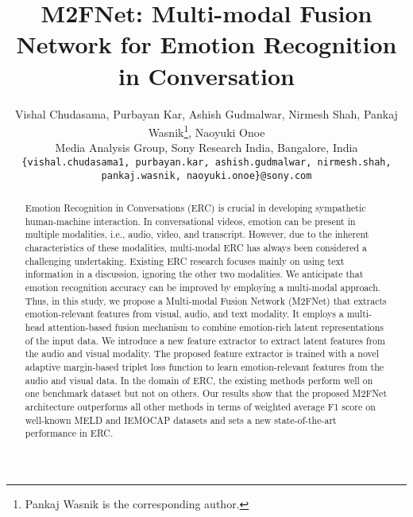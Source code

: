 \documentclass[10pt,twocolumn,letterpaper]{article}
\begin{document}
\title{M2FNet: Multi-modal Fusion Network for Emotion Recognition in Conversation}

\author{Vishal Chudasama, Purbayan Kar, Ashish Gudmalwar, Nirmesh Shah, Pankaj Wasnik\thanks{Pankaj Wasnik is the corresponding author.}, Naoyuki Onoe \\ Media Analysis Group, Sony Research India, Bangalore, India\\
\tt\small\{vishal.chudasama1, purbayan.kar, ashish.gudmalwar, nirmesh.shah,\\ 
\tt\small pankaj.wasnik, naoyuki.onoe\}@sony.com}

\maketitle
\begin{abstract}
Emotion Recognition in Conversations (ERC) is crucial in developing sympathetic human-machine interaction. In conversational videos, emotion can be present in multiple modalities, i.e., audio, video, and transcript. However, due to the inherent characteristics of these modalities, multi-modal ERC has always been considered a challenging undertaking. Existing ERC research focuses mainly on using text information in a discussion, ignoring the other two modalities. We anticipate that emotion recognition accuracy can be improved by employing a multi-modal approach. Thus, in this study, we propose a Multi-modal Fusion Network (M2FNet) that extracts emotion-relevant features from visual, audio, and text modality. It employs a multi-head attention-based fusion mechanism to combine emotion-rich latent representations of the input data. We introduce a new feature extractor to extract latent features from the audio and visual modality. The proposed feature extractor is trained with a novel adaptive margin-based triplet loss function to learn emotion-relevant features from the audio and visual data. In the domain of ERC, the existing methods perform well on one benchmark dataset but not on others. Our results show that the proposed M2FNet architecture outperforms all other methods in terms of weighted average F1 score on well-known MELD and IEMOCAP datasets and sets a new state-of-the-art performance in ERC.
\end{abstract}
\end{document}
